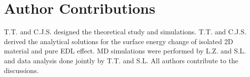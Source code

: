 \section{Author Contributions}
\label{sec:wet-author-contributions}

T.T. and C.J.S. designed the theoretical study and
simulations. T.T. and C.J.S. derived the analytical solutions for the
surface energy change of isolated 2D material and pure EDL effect. MD
simulations were performed by L.Z. and S.L. and data analysis done
jointly by T.T. and S.L. All authors contribute to the discussions.






% 




